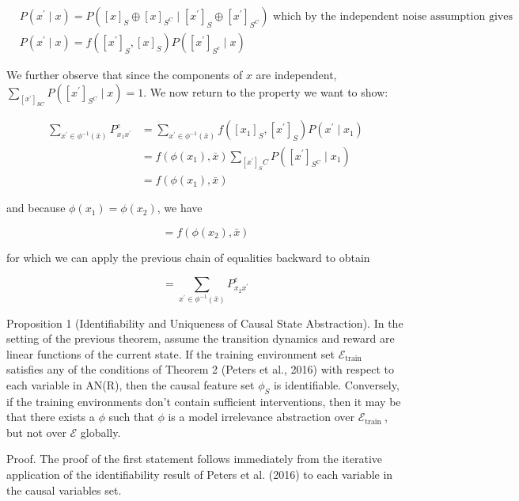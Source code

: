 \documentclass[10pt]{article}
\begin{document}
\[
\begin{aligned}
& P\left(x^{\prime} \mid x\right)=P\left([x]_{S} \oplus[x]_{S^{C}} \mid\left[x^{\prime}\right]_{S} \oplus\left[x^{\prime}\right]_{S^{C}}\right) \text { which by the independent noise assumption gives } \\
& P\left(x^{\prime} \mid x\right)=f\left(\left[x^{\prime}\right]_{S},[x]_{S}\right) P\left(\left[x^{\prime}\right]_{S^{c}} \mid x\right)
\end{aligned}
\]

We further observe that since the components of $x$ are independent, $\sum_{\left[x^{\prime}\right]_{S C}} P\left(\left[x^{\prime}\right]_{S^{C}} \mid x\right)=1$. We now return to the property we want to show:

\[
\begin{aligned}
\sum_{x^{\prime} \in \phi^{-1}(\bar{x})} P_{x_{1} x^{\prime}}^{e} & =\sum_{x^{\prime} \in \phi^{-1}(\bar{x})} f\left(\left[x_{1}\right]_{S},\left[x^{\prime}\right]_{S}\right) P\left(x^{\prime} \mid x_{1}\right) \\
& =f\left(\phi\left(x_{1}\right), \bar{x}\right) \sum_{\left[x^{\prime}\right]_{S} C} P\left(\left[x^{\prime}\right]_{S^{C}} \mid x_{1}\right) \\
& =f\left(\phi\left(x_{1}\right), \bar{x}\right)
\end{aligned}
\]

and because $\phi\left(x_{1}\right)=\phi\left(x_{2}\right)$, we have

\[
=f\left(\phi\left(x_{2}\right), \bar{x}\right)
\]

for which we can apply the previous chain of equalities backward to obtain

\[
=\sum_{x^{\prime} \in \phi^{-1}(\bar{x})} P_{x_{2} x^{\prime}}^{e}
\]

Proposition 1 (Identifiability and Uniqueness of Causal State Abstraction). In the setting of the previous theorem, assume the transition dynamics and reward are linear functions of the current state. If the training environment set $\mathcal{E}_{\text {train }}$ satisfies any of the conditions of Theorem 2 (Peters et al., 2016) with respect to each variable in AN(R), then the causal feature set $\phi_{S}$ is identifiable. Conversely, if the training environments don't contain sufficient interventions, then it may be that there exists a $\phi$ such that $\phi$ is a model irrelevance abstraction over $\mathcal{E}_{\text {train }}$, but not over $\mathcal{E}$ globally.

Proof. The proof of the first statement follows immediately from the iterative application of the identifiability result of Peters et al. (2016) to each variable in the causal variables set.
\end{document}
